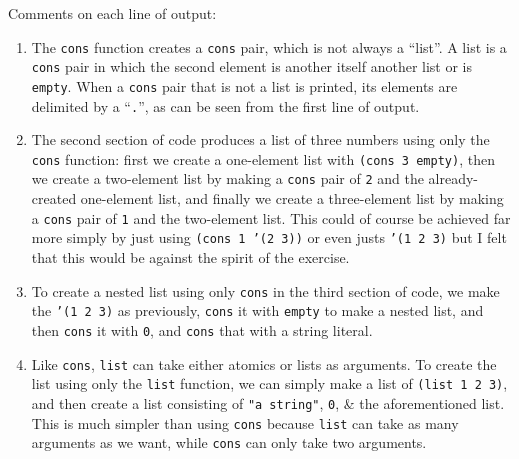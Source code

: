 \documentclass[a4paper]{article}
\begin{document}
Comments on each line of output:
\begin{enumerate}
    \item   The \texttt{cons} function creates a \texttt{cons} pair, which is not always a ``list''. 
            A list is a \texttt{cons} pair in which the second element is another itself another list or is \texttt{empty}.
            When a \texttt{cons} pair that is not a list is printed, its elements are delimited by a ``\verb|.|'', as can be seen from the first line of
            output.

    \item   The second section of code produces a list of three numbers using only the \texttt{cons} function: 
            first we create a one-element list with \texttt{(cons 3 empty)}, then we create a two-element list by making a \texttt{cons} pair
            of \texttt{2} and the already-created one-element list, and finally we create a three-element list by making a \texttt{cons} pair
            of \texttt{1} and the two-element list.
            This could of course be achieved far more simply by just using \texttt{(cons 1 '(2 3))} or even justs \texttt{'(1 2 3)} but I
            felt that this would be against the spirit of the exercise.
    
    \item   To create a nested list using only \texttt{cons} in the third section of code, we make the \texttt{'(1 2 3)} as previously, 
            \texttt{cons} it with \texttt{empty} to make a nested list, and then \texttt{cons} it with \texttt{0}, and 
            \texttt{cons} that with a string literal.

    \item   Like \texttt{cons}, \texttt{list} can take either atomics or lists as arguments.
            To create the list using only the \texttt{list} function, we can simply make a list of \texttt{(list 1 2 3)}, and then create a 
            list consisting of \texttt{"a string"}, \texttt{0}, \& the aforementioned list.
            This is much simpler than using \texttt{cons} because \texttt{list} can take as many arguments as we want, while 
            \texttt{cons} can only take two arguments.


\end{enumerate}
\end{document}
